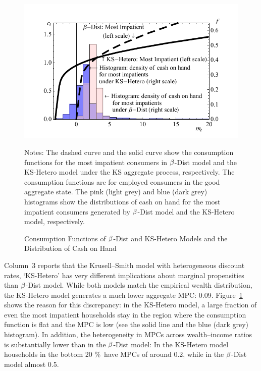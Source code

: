 \documentclass[12pt,titlepage]{econtex}
\newcommand{\jbemph}[1]{{\textbf{\color{jirkasblue}#1}}}
\begin{document}
\begin{figure}
  \caption{Consumption Functions of  $\beta$-Dist and KS-Hetero Models and the Distribution of Cash on Hand}
  \label{CFuncKSHeteroAndDistSevenAndHistDataKSHeteroPlot}
  \begin{center}
    \includegraphics[scale=1.25]{./Figures/CFuncKSHeteroAndDistSevenAndHistDataKSHeteroPlot}
  \end{center}
    {\footnotesize Notes: The dashed curve and the solid curve show the consumption functions for the most impatient consumers in $\beta$-Dist model and the KS-Hetero model under the KS aggregate process, respectively. The consumption functions are for employed consumers in the good aggregate state. The pink (light grey) and blue (dark grey) histograms show the distributions of cash on hand for the most impatient consumers generated by $\beta$-Dist model and the KS-Hetero model, respectively.}
\end{figure}

Column~3 reports that the Krusell--Smith model with heterogeneous discount rates, `KS-Hetero' has very different implications about marginal propensities than $\beta$-Dist model.  While both models match the empirical wealth distribution, the KS-Hetero model generates a much lower aggregate MPC: 0.09. Figure~\ref{CFuncKSHeteroAndDistSevenAndHistDataKSHeteroPlot} shows the reason for this discrepancy: in the KS-Hetero model, a large fraction of even the most impatient households stay in the region where the consumption function is flat and the MPC is low (see the solid line and the blue (dark grey) histogram). In addition, the heterogeneity in MPCs across wealth--income ratios is substantially lower than in the $\beta$-Dist model: In the KS-Hetero model households in the bottom 20 \%\ have MPCs of around 0.2, while in the $\beta$-Dist model almost 0.5.
\end{document}
